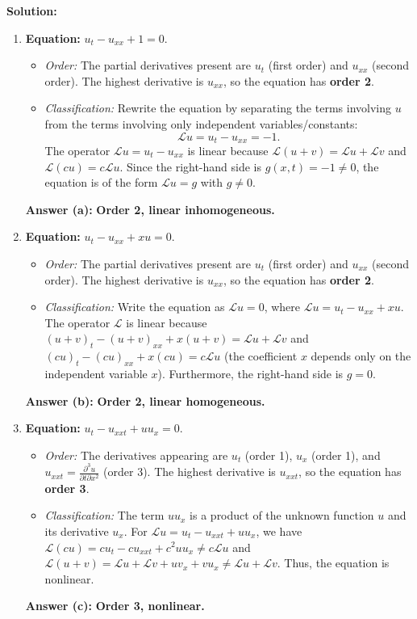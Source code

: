 \documentclass[11pt,a4paper]{article}
\begin{document}
\textbf{Solution:}
\begin{enumerate}[label=(\alph*)]
    \item \textbf{Equation:} $u_t - u_{xx} + 1 = 0$.
    \begin{itemize}
        \item \emph{Order:} The partial derivatives present are $u_t$ (first order) and $u_{xx}$ (second order). The highest derivative is $u_{xx}$, so the equation has \textbf{order 2}.
        \item \emph{Classification:} Rewrite the equation by separating the terms involving $u$ from the terms involving only independent variables/constants:
        \[
            \mathcal{L}u = u_t - u_{xx} = -1.
        \]
        The operator $\mathcal{L}u = u_t - u_{xx}$ is linear because $\mathcal{L}(u+v) = \mathcal{L}u + \mathcal{L}v$ and $\mathcal{L}(cu) = c\mathcal{L}u$. Since the right-hand side is $g(x, t) = -1 \neq 0$, the equation is of the form $\mathcal{L}u = g$ with $g \neq 0$.
    \end{itemize}
    \textbf{Answer (a):} \textbf{Order 2, linear inhomogeneous.}

    \item \textbf{Equation:} $u_t - u_{xx} + x u = 0$.
    \begin{itemize}
        \item \emph{Order:} The partial derivatives present are $u_t$ (first order) and $u_{xx}$ (second order). The highest derivative is $u_{xx}$, so the equation has \textbf{order 2}.
        \item \emph{Classification:} Write the equation as $\mathcal{L}u = 0$, where $\mathcal{L}u = u_t - u_{xx} + x u$. The operator $\mathcal{L}$ is linear because $(u+v)_t - (u+v)_{xx} + x(u+v) = \mathcal{L}u + \mathcal{L}v$ and $(cu)_t - (cu)_{xx} + x(cu) = c\mathcal{L}u$ (the coefficient $x$ depends only on the independent variable $x$). Furthermore, the right-hand side is $g = 0$.
    \end{itemize}
    \textbf{Answer (b):} \textbf{Order 2, linear homogeneous.}

    \item \textbf{Equation:} $u_t - u_{xxt} + u u_x = 0$.
    \begin{itemize}
        \item \emph{Order:} The derivatives appearing are $u_t$ (order 1), $u_x$ (order 1), and $u_{xxt} = \frac{\partial^3 u}{\partial t \partial x^2}$ (order 3). The highest derivative is $u_{xxt}$, so the equation has \textbf{order 3}.
        \item \emph{Classification:} The term $u u_x$ is a product of the unknown function $u$ and its derivative $u_x$. For $\mathcal{L}u = u_t - u_{xxt} + u u_x$, we have $\mathcal{L}(cu) = c u_t - c u_{xxt} + c^2 u u_x \neq c\mathcal{L}u$ and $\mathcal{L}(u+v) = \mathcal{L}u + \mathcal{L}v + u v_x + v u_x \neq \mathcal{L}u + \mathcal{L}v$. Thus, the equation is nonlinear.
    \end{itemize}
    \textbf{Answer (c):} \textbf{Order 3, nonlinear.}


\end{enumerate}
\end{document}
